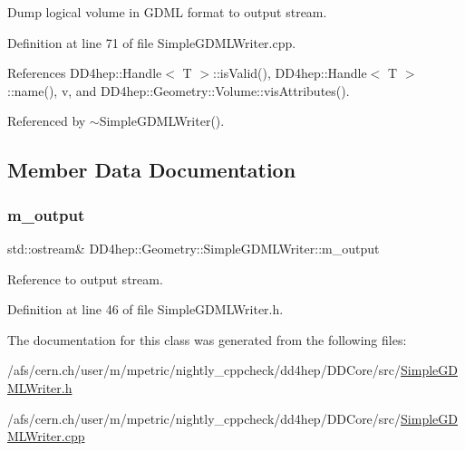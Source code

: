 Dump logical volume in G\+D\+ML format to output stream. 



Definition at line 71 of file Simple\+G\+D\+M\+L\+Writer.\+cpp.



References D\+D4hep\+::\+Handle$<$ T $>$\+::is\+Valid(), D\+D4hep\+::\+Handle$<$ T $>$\+::name(), v, and D\+D4hep\+::\+Geometry\+::\+Volume\+::vis\+Attributes().



Referenced by $\sim$\+Simple\+G\+D\+M\+L\+Writer().



\subsection{Member Data Documentation}
\hypertarget{class_d_d4hep_1_1_geometry_1_1_simple_g_d_m_l_writer_acfe610e807da01fe85b3e2bf5f94f428}{}\label{class_d_d4hep_1_1_geometry_1_1_simple_g_d_m_l_writer_acfe610e807da01fe85b3e2bf5f94f428} 
\subsubsection{\texorpdfstring{m\+\_\+output}{m\_output}}
{\footnotesize\ttfamily std\+::ostream\& D\+D4hep\+::\+Geometry\+::\+Simple\+G\+D\+M\+L\+Writer\+::m\+\_\+output}



Reference to output stream. 



Definition at line 46 of file Simple\+G\+D\+M\+L\+Writer.\+h.



The documentation for this class was generated from the following files\+:\begin{DoxyCompactItemize}
\item 
/afs/cern.\+ch/user/m/mpetric/nightly\+\_\+cppcheck/dd4hep/\+D\+D\+Core/src/\hyperlink{_simple_g_d_m_l_writer_8h}{Simple\+G\+D\+M\+L\+Writer.\+h}\item 
/afs/cern.\+ch/user/m/mpetric/nightly\+\_\+cppcheck/dd4hep/\+D\+D\+Core/src/\hyperlink{_simple_g_d_m_l_writer_8cpp}{Simple\+G\+D\+M\+L\+Writer.\+cpp}\end{DoxyCompactItemize}
